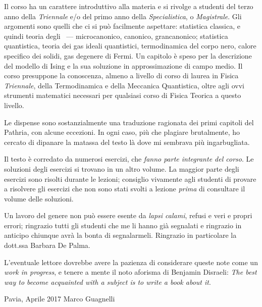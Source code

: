 Il corso ha un carattere introduttivo alla materia e si rivolge a studenti del terzo anno della {\em Triennale} e/o del primo anno della {\em Specialistica}, o {\em Magistrale}. Gli argomenti sono quelli che ci si può facilmente aspettare: statistica classica, e quindi teoria degli \ensembles\ --- microcanonico, canonico, grancanonico; statistica quantistica, teoria dei gas ideali quantistici, termodinamica del corpo nero, calore specifico dei solidi, gas degenere di Fermi. Un capitolo è speso per la descrizione del modello di Ising e la sua soluzione in approssimazione di campo medio. Il corso presuppone la conoscenza, almeno a livello di corso di laurea in Fisica {\em Triennale}, della Termodinamica e della Meccanica Quantistica, oltre agli ovvi strumenti matematici necessari per qualsiasi corso di Fisica Teorica a questo livello.

Le dispense sono sostanzialmente una traduzione ragionata dei primi capitoli del Pathria, con alcune eccezioni. In ogni caso, più che plagiare brutalmente, ho cercato di dipanare la matassa del testo là dove mi sembrava più ingarbugliata.

Il testo è corredato da numerosi esercizi, che {\em fanno parte integrante del corso}. Le soluzioni degli esercizi si trovano in un altro volume. La maggior parte degli esercizi sono risolti durante le lezioni; consiglio vivamente agli studenti di provare a risolvere gli esercizi che non sono stati svolti a lezione {\em prima} di consultare il volume delle soluzioni.

Un lavoro del genere non può essere esente da {\em lapsi calami}, refusi e veri e propri errori; ringrazio tutti gli studenti che me li hanno già segnalati e ringrazio in anticipo chiunque avrà la bonta di segnalarmeli. Ringrazio in particolare la dott.ssa Barbara De Palma.
 
L'eventuale lettore dovrebbe avere la pazienza di considerare queste note come un {\em work in progress}, e tenere a mente il noto aforisma di Benjamin Disraeli: {\em The best way to become acquainted with a subject is to write a book about it}.

\vskip 1cm
\noindent
Pavia, Aprile 2017 \hfill Marco Guagnelli


